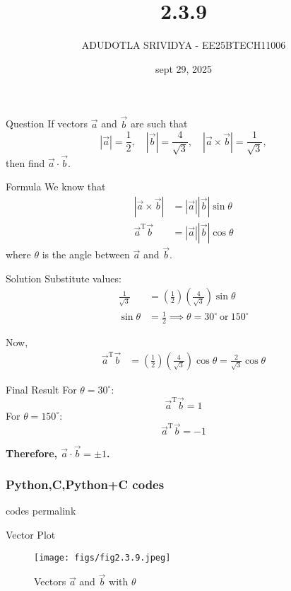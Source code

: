 \documentclass{beamer}
\title
{2.3.9}
\date{sept 29, 2025}
\author 
{ADUDOTLA SRIVIDYA - EE25BTECH11006}
\begin{document}
\frame{\titlepage}


\begin{frame}{Question}
If vectors $\vec{a}$ and $\vec{b}$ are such that 
\[
|\vec{a}| = \frac{1}{2}, \quad |\vec{b}| = \frac{4}{\sqrt{3}}, \quad |\vec{a} \times \vec{b}| = \frac{1}{\sqrt{3}},
\]
then find $\vec{a} \cdot \vec{b}$.
\end{frame}


\begin{frame}{Formula}
We know that
\begin{align}
|\vec{a} \times \vec{b}| &= |\vec{a}||\vec{b}|\sin\theta \\
\vec{a}^{\mathrm{T}} \vec{b} &= |\vec{a}||\vec{b}|\cos\theta
\end{align}
where $\theta$ is the angle between $\vec{a}$ and $\vec{b}$.
\end{frame}


\begin{frame}{Solution}
Substitute values:
\begin{align}
\frac{1}{\sqrt{3}} &= \left(\frac{1}{2}\right)\left(\frac{4}{\sqrt{3}}\right)\sin\theta \\
\sin\theta &= \frac{1}{2} \implies \theta = 30^\circ \ \text{or}\ 150^\circ
\end{align}

Now,
\begin{align}
\vec{a}^{\mathrm{T}} \vec{b} &= \left(\frac{1}{2}\right)\left(\frac{4}{\sqrt{3}}\right)\cos\theta = \frac{2}{\sqrt{3}}\cos\theta
\end{align}
\end{frame}


\begin{frame}{Final Result}
For $\theta = 30^\circ$:
\[
\vec{a}^{\mathrm{T}} \vec{b} = 1
\]
For $\theta = 150^\circ$:
\[
\vec{a}^{\mathrm{T}} \vec{b} = -1
\]

\centering
\textbf{Therefore, $\vec{a} \cdot \vec{b} = \pm 1$.}
\end{frame}


\begin{frame}[fragile]
\frametitle{Python,C,Python+C codes}
codes permalink
\end{frame}

\begin{frame}{Vector Plot}
\begin{figure}
    \centering
    \texttt{[image: figs/fig2.3.9.jpeg]}
    \caption{Vectors $\vec{a}$ and $\vec{b}$ with $\theta$}
    \label{fig:plot}
\end{figure}
\end{frame}
\end{document}
